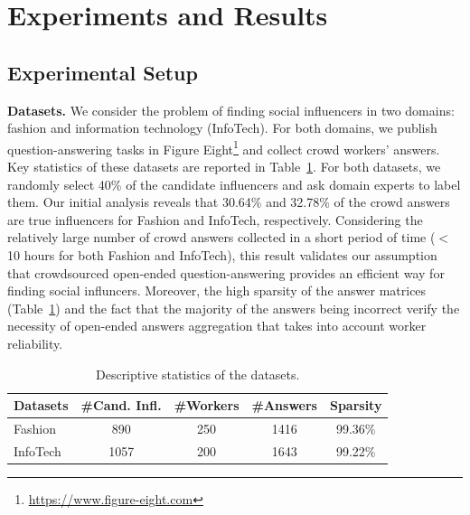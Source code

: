 \section{Experiments and Results}

\subsection{Experimental Setup}

\noindent\textbf{Datasets.} We consider the problem of finding social influencers in two domains: fashion and information technology (InfoTech). For both domains, we publish question-answering tasks in Figure Eight\footnote{\url{https://www.figure-eight.com}} and collect crowd workers' answers. Key statistics of these datasets are reported in Table~\ref{tab:datasets}. For both datasets, we randomly select 40\% of the candidate influencers and ask domain experts to label them. Our initial analysis reveals that 30.64\% and 32.78\%  of the crowd answers are true influencers for Fashion and InfoTech, respectively. Considering the relatively large number of crowd answers collected in a short period of time ($<$10 hours for both Fashion and InfoTech), this result validates our assumption that crowdsourced open-ended question-answering provides an efficient way for finding social influncers. Moreover, the high sparsity of the answer matrices (Table~\ref{tab:datasets}) and the fact that the majority of the answers being incorrect verify the necessity of open-ended answers aggregation that takes into account worker reliability.

\begin{table}[!ht]
\centering \caption{Descriptive statistics of the
datasets.}\label{tab:datasets}
\addtolength{\tabcolsep}{-1mm}
\begin{tabular}{lcccc}
\toprule
    Datasets & \textbf{\#Cand. Infl.} & \textbf{\#Workers} & \textbf{\#Answers} & \textbf{Sparsity}   \\\midrule
    Fashion & 890 & 250 & 1416  & 99.36\% \\
    InfoTech & 1057 & 200 &1643 & 99.22\% \\
\bottomrule
\end{tabular}
\end{table}

